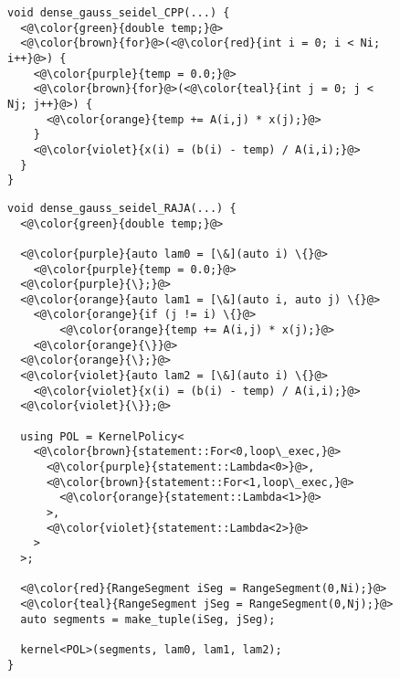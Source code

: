 \begin{figure*}

  \begin{subfigure}{0.44\columnwidth}
\begin{lstlisting}[caption={C++ reference implementation of dense Gauss-Seidel iterative solve loop nest.}]
void dense_gauss_seidel_CPP(...) {
  <@\color{green}{double temp;}@>
  <@\color{brown}{for}@>(<@\color{red}{int i = 0; i < Ni; i++}@>) {
    <@\color{purple}{temp = 0.0;}@>
    <@\color{brown}{for}@>(<@\color{teal}{int j = 0; j < Nj; j++}@>) {
      <@\color{orange}{temp += A(i,j) * x(j);}@>
    }
    <@\color{violet}{x(i) = (b(i) - temp) / A(i,i);}@>
  }
}
\end{lstlisting}
  \end{subfigure}
  \hspace{0.02\columnwidth}
  \begin{subfigure}{0.49\columnwidth}
\begin{lstlisting}[caption={RAJA reference implementation of dense Gauss-Seidel iterative solve.}]
void dense_gauss_seidel_RAJA(...) {
  <@\color{green}{double temp;}@>

  <@\color{purple}{auto lam0 = [\&](auto i) \{}@>
    <@\color{purple}{temp = 0.0;}@>
  <@\color{purple}{\};}@>
  <@\color{orange}{auto lam1 = [\&](auto i, auto j) \{}@>
    <@\color{orange}{if (j != i) \{}@>
        <@\color{orange}{temp += A(i,j) * x(j);}@>
    <@\color{orange}{\}}@>
  <@\color{orange}{\};}@>
  <@\color{violet}{auto lam2 = [\&](auto i) \{}@>
    <@\color{violet}{x(i) = (b(i) - temp) / A(i,i);}@>
  <@\color{violet}{\}};@>

  using POL = KernelPolicy<
    <@\color{brown}{statement::For<0,loop\_exec,}@>
      <@\color{purple}{statement::Lambda<0>}@>,
      <@\color{brown}{statement::For<1,loop\_exec,}@>
        <@\color{orange}{statement::Lambda<1>}@>
      >,
      <@\color{violet}{statement::Lambda<2>}@>
    >
  >;
  
  <@\color{red}{RangeSegment iSeg = RangeSegment(0,Ni);}@>
  <@\color{teal}{RangeSegment jSeg = RangeSegment(0,Nj);}@>
  auto segments = make_tuple(iSeg, jSeg);

  kernel<POL>(segments, lam0, lam1, lam2);
}

\end{lstlisting}

  \end{subfigure}
\caption{Comparison of C++ and RAJA implementations of dense Gauss-Seidel iterative solve. Text color links parts of each listing with similar function. The RAJA implementation is longer due to the decoupling of the different components of the computation.}\label{DenseDenseComparison}
\end{figure*}

